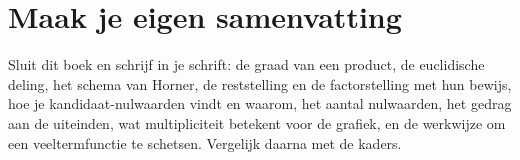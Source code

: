 
\begin{oefeningen}





\end{oefeningen}


\ifzelfstudie
\section*{Maak je eigen samenvatting}
Sluit dit boek en schrijf in je schrift: de graad van een product, de euclidische deling, het schema van Horner, de reststelling en de factorstelling met hun bewijs, hoe je kandidaat-nulwaarden vindt en waarom, het aantal nulwaarden, het gedrag aan de uiteinden, wat multipliciteit betekent voor de grafiek, en de werkwijze om een veeltermfunctie te schetsen. Vergelijk daarna met de kaders.
\fi
